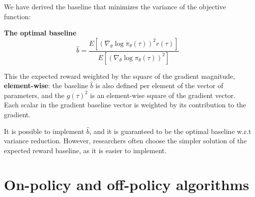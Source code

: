 \documentclass{article}
\begin{document}
We have derived the baseline that minimizes the variance of the objective function:

\begin{shaded}
  \textbf{The optimal baseline}
  \begin{equation}
    \hat{b} =\frac{E\left[\left(\nabla_{\theta} \log \pi_{\theta}(\tau)\right)^{2} r(\tau)\right]}{E\left[\left(\nabla_{\theta} \log \pi_{\theta}(\tau)\right)^{2}\right]}
  \end{equation}
\end{shaded}

This the expected reward weighted by the square of the gradient magnitude, \textbf{element-wise}: the baseline $\hat{b}$ is also defined per element of the vector of parameters, and the $g(\tau)^{2}$ is an element-wise square of the gradient vector. Each scalar in the gradient baseline vector is weighted by its contribution to the gradient.

It is possible to implement $\hat{b}$, and it is guaranteed to be the optimal baseline w.r.t variance reduction. However, researchers often choose the simpler solution of the expected reward baseline, as it is easier to implement.

\section{On-policy and off-policy algorithms}

\small


\end{document}
